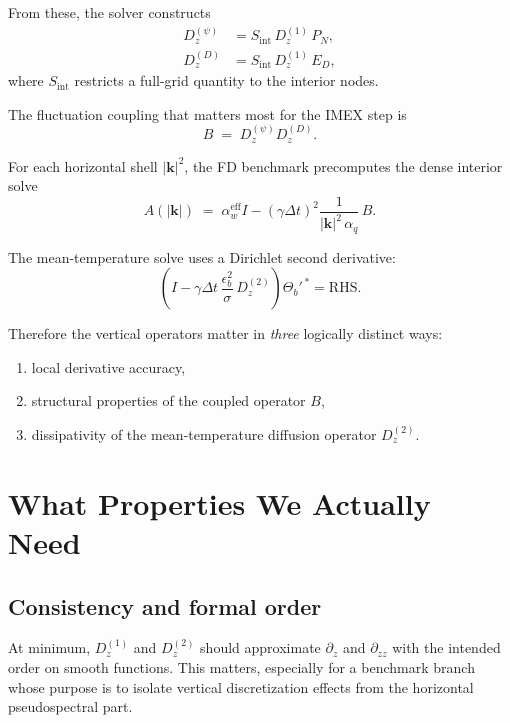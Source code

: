 \documentclass[11pt]{article}
\newcommand{\kh}{|\bm{k}|}
\newcommand{\Dzone}{D^{(1)}_z}
\newcommand{\Dztwo}{D^{(2)}_z}
\newcommand{\Emat}{E_D}
\newcommand{\Pmat}{P_N}
\begin{document}
From these, the solver constructs
\begin{align}
D^{(\psi)}_z &= S_{\mathrm{int}}\,\Dzone\,\Pmat,
\\
D^{(D)}_z &= S_{\mathrm{int}}\,\Dzone\,\Emat,
\end{align}
where $S_{\mathrm{int}}$ restricts a full-grid quantity to the interior nodes.

The fluctuation coupling that matters most for the IMEX step is
\begin{equation}
\boxed{
B \;=\; D^{(\psi)}_z D^{(D)}_z.
}
\label{eq:B_def}
\end{equation}

For each horizontal shell $\kh^2$, the FD benchmark precomputes the dense
interior solve
\begin{equation}
\boxed{
A(\kh) \;=\; \alpha_w^{\mathrm{eff}} I
- (\gamma \Delta t)^2 \frac{1}{\kh^2\,\alpha_q}\, B.
}
\label{eq:A_shell}
\end{equation}

The mean-temperature solve uses a Dirichlet second derivative:
\begin{equation}
\boxed{
\left(I - \gamma \Delta t\, \frac{\epsilon_b^2}{\sigma}\, \Dztwo \right)\Theta_b'^{\,*}
= \text{RHS}.
}
\label{eq:mean_temp_solve}
\end{equation}

Therefore the vertical operators matter in \emph{three} logically distinct ways:
\begin{enumerate}[nosep]
\item local derivative accuracy,
\item structural properties of the coupled operator $B$,
\item dissipativity of the mean-temperature diffusion operator $\Dztwo$.
\end{enumerate}

\section{What Properties We Actually Need}

\subsection{Consistency and formal order}

At minimum, $\Dzone$ and $\Dztwo$ should approximate $\partial_z$ and
$\partial_{zz}$ with the intended order on smooth functions. This matters,
especially for a benchmark branch whose purpose is to isolate vertical
discretization effects from the horizontal pseudospectral part.
\end{document}
